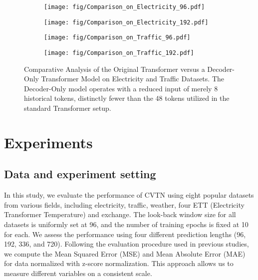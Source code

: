 \begin{figure}[h]
  \centering
  \begin{subfigure}{.5\textwidth}
      \centering
      \texttt{[image: fig/Comparison\_on\_Electricity\_96.pdf]}
  \end{subfigure}  \begin{subfigure}{.5\textwidth}
      \centering
      \texttt{[image: fig/Comparison\_on\_Electricity\_192.pdf]}
  \end{subfigure}
  \begin{subfigure}{.5\textwidth}
    \centering
    \texttt{[image: fig/Comparison\_on\_Traffic\_96.pdf]}
  \end{subfigure}  \begin{subfigure}{.5\textwidth}
      \centering
      \texttt{[image: fig/Comparison\_on\_Traffic\_192.pdf]}
  \end{subfigure}
  
  \caption{Comparative Analysis of the Original Transformer versus a Decoder-Only Transformer Model on Electricity and Traffic Datasets. The Decoder-Only model operates with a reduced input of merely 8 historical tokens, distinctly fewer than the 48 tokens utilized in the standard Transformer setup. 
  }
  \label{fig:Comp}
\end{figure}

\section{Experiments}
\subsection{Data and experiment setting}
In this study, we evaluate the performance of CVTN using eight popular datasets from various fields, including electricity\cite{misc_electricityloaddiagrams20112014_321}, traffic\cite{pems_traffic}, weather\cite{wetterstation}, four ETT (Electricity Transformer Temperature)\cite{zhou2021informer} and exchange\cite{lai2018modeling}. The look-back window size for all datasets is uniformly set at 96, and the number of training epochs is fixed at 10 for each. We assess the performance using four different prediction lengths (96, 192, 336, and 720). Following the evaluation procedure used in previous studies, we compute the Mean Squared Error (MSE) and Mean Absolute Error (MAE) for data normalized with z-score normalization. This approach allows us to measure different variables on a consistent scale.





